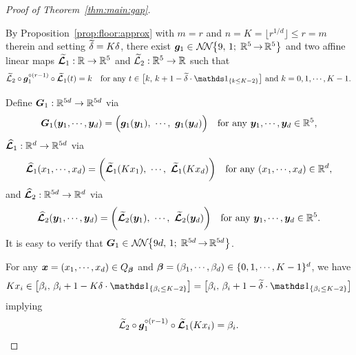 \documentclass[nohyperref]{article}
\theoremstyle{plain}
\theoremstyle{definition}
\theoremstyle{remark}
\begin{document}
\begin{proof}[Proof of Theorem~\ref{thm:main:gap}]
\begin{figure}[htbp!]
\end{figure}


By Proposition~\ref{prop:floor:approx} with   $m=r$ and $n=K=\lfloor r^{1/d}\rfloor \le r= m$ therein and setting ${\widetilde{\delta}}=K\delta$,
		there exist $\bmg_1 \in
\nn[\big]{9}{1}{5}{5}$
and two affine linear maps $\bmtildecalL_1:\R\to\R^5$ and $\tildecalL_2:\R^5\to \R$ such that
\begin{equation*}%
	\tildecalL_2\circ\bmg_1^{\circ (r-1)}\circ \bmtildecalL_1(t)=k\quad \tn{for any $t\in\big[k,\,k+1-\tildedelta\cdot \one_{\{k\le K-2\}}\big]$ and $k=0,1,\dotsc,K-1$.}
\end{equation*}

Define $\bmG_1:\R^{5d}\to \R^{5d}$ via
\begin{equation*}	\bmG_1(\bmy_1,\dotsc,\bmy_d)=\Big(\bmg_1(\bmy_1),\  \dotsc,\  \bmg_1(\bmy_d)\Big)\quad \tn{for any $\bmy_1,\dotsc,\bmy_d\in \R^5$},
\end{equation*}
$\bmhatcalL_1:\R^d\to \R^{5d}$ via
\begin{equation*}	\bmhatcalL_1(x_1,\dotsc,x_d)=\bigg(\bmtildecalL_1(Kx_1),\ \dotsc,\  \bmtildecalL_1(Kx_d)\bigg)\quad \tn{for any $(x_1,\dotsc,x_d)\in \R^d$},
\end{equation*}
and $\bmhatcalL_2:\R^{5d}\to \R^{d}$ via
\begin{equation*}
	\bmhatcalL_2(\bmy_1,\dotsc,\bmy_d)=\bigg(\bmtildecalL_2(\bmy_1),\  \dotsc,\  \bmtildecalL_2(\bmy_d)\bigg)\quad \tn{for any $\bmy_1,\dotsc,\bmy_d\in \R^5$}.
\end{equation*}
It is easy to verify that 
$\bmG_1 \in
\nn[\big]{9d}{1}{5d}{5d}$.


For any $\bmx=(x_1,\dotsc,x_d)\in Q_\bmbeta$ and $\bmbeta=(\beta_1,\dotsc,\beta_d)\in \{0,1,\dotsc,K-1\}^d$, we have
\begin{equation*}
	Kx_i\in \big[\beta_i,\, \beta_i+1-K\delta \cdot \one_{\{\beta_i\le K-2\}}\big]
	=\big[\beta_i,\, \beta_i+1-\tildedelta \cdot \one_{\{\beta_i\le K-2\}}\big]
\end{equation*}
 implying 
\begin{equation*}
	{\mathcal{\widetilde{L}}}_2\circ{\bm{g}}_1^{\circ (r-1)}\circ {\bm{\mathcal{\widetilde{L}}}}_1(Kx_i)=\beta_i.
\end{equation*}


\end{proof}
\end{document}
